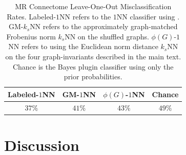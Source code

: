 \documentclass[10pt,journal,cspaper,compsoc]{IEEEtran}
\begin{document}
% 
% 

\begin{table}[h!]
\caption{MR Connectome Leave-One-Out Misclassification Rates. Labeled-$1$NN refers to the $1$NN classifier using . GM-$k_s$NN refers to the approximately graph-matched Frobenius norm $k_s$NN on the shuffled graphs.  $\phi(G)$-$1$NN refers to using the Euclidean norm distance $k_s$NN on the four graph-invariants described in the main text. Chance is the Bayes plugin classifier using only the prior probabilities.  }
\begin{center}
\begin{tabular}{|c|c|c|c|}
\hline
Labeled-$1$NN & GM-$1$NN & $\phi(G)$-$1$NN & Chance\\
\hline
$37\%$ & $41\%$ & $43\%$ & $49\%$ \\
    \hline
\end{tabular}
\end{center}
\label{tab:connectome}
\end{table}%


\section{Discussion}
\end{document}
